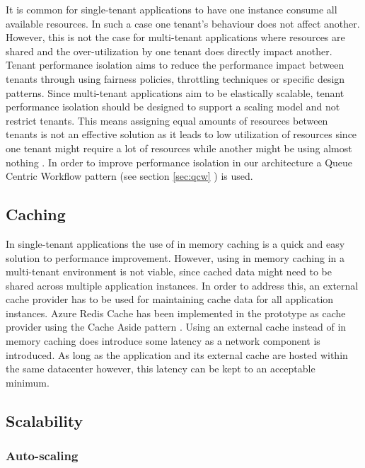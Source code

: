 It is common for single-tenant applications to have one instance consume all available resources. In such a case one tenant's behaviour does not affect another. However, this is not the case for multi-tenant applications where resources are shared and the over-utilization by one tenant does directly impact another. Tenant performance isolation aims to reduce the performance impact between tenants through using fairness policies, throttling techniques or specific design patterns. Since multi-tenant applications aim to be elastically scalable, tenant performance isolation should be designed to support a scaling model and not restrict tenants. This means assigning equal amounts of resources between tenants is not an effective solution as it leads to low utilization of resources since one tenant might require a lot of resources while another might be using almost nothing \cite{Bezemer:2010:MSA:1862372.1862393}. In order to improve performance isolation in our architecture a Queue Centric Workflow pattern (see section \ref{sec:qcw} ) \cite{Wilder2012-so} is used.

\subsection{Caching}

In single-tenant applications the use of in memory caching is a quick and easy solution to performance improvement. However, using in memory caching in a multi-tenant environment is not viable, since cached data might need to be shared across multiple application instances. In order to address this, an external cache provider has to be used for maintaining cache data for all application instances. Azure Redis Cache has been implemented in the prototype as cache provider using the Cache Aside pattern \cite{Swanson}. Using an external cache instead of in memory caching does introduce some latency as a network component is introduced. As long as the application and its external cache are hosted within the same datacenter however, this latency can be kept to an acceptable minimum.


\subsection{Scalability}
\label{sec:scalability}

\subsubsection{Auto-scaling}

